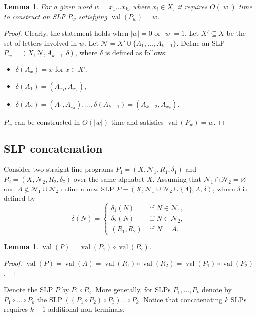 \documentclass[12pt,oneside]{amsart}
\newtheorem{lemma}[theorem]{Lemma}
\theoremstyle{definition}
\theoremstyle{case}
\def\CN{{\mathcal N}}
\DeclareMathOperator{\val}{val}
\begin{document}
\begin{lemma}\label{le:CP-w}
For a given word $w = x_1 \dots x_k$, where $x_i\in X$,
it requires $O(|w|)$ time to construct 
an SLP $P_w$ satisfying $\val(P_w) = w$.
\end{lemma}

\begin{proof}
Clearly, the statement holds when $|w|=0$ or $|w|=1$.
Let $X'\subseteq X$ be the set of letters involved in $w$.
Let $\CN=X' \cup \{A_1,\dots,A_{k-1}\}$.
Define an SLP $P_w=(X,\CN,A_{k-1},\delta)$, where $\delta$
is defined as follows:
\begin{itemize}
\item 
$\delta(A_x)=x$ for $x\in X'$,
\item 
$\delta(A_1) = (A_{x_1}, A_{x_2})$,
\item 
$\delta(A_2) = (A_1, A_{x_3}), \dots,\delta(A_{k-1}) = (A_{k-2}, A_{x_k})$.
\end{itemize}
$P_w$ can be constructed in $O(|w|)$ time and
satisfies $\val(P_w) = w$.
\end{proof}

\subsection{SLP concatenation}

Consider two straight-line programs 
$P_1 = (X, \CN_1, R_1, \delta_1)$ and
$P_2 = (X, \CN_2, R_2, \delta_2)$ over the same alphabet $X$.
Assuming that $\CN_1\cap\CN_2 = \varnothing$ and $A\notin \CN_1\cup\CN_2$
define a new SLP $P = (X, \CN_1\cup\CN_2 \cup \{A\}, A, \delta)$, where
$\delta$ is defined by
$$
\delta(N) = 
\begin{cases}
\delta_1(N) & \mbox{ if } N\in\CN_1,\\
\delta_2(N) & \mbox{ if } N\in\CN_2,\\
(R_1,R_2) & \mbox{ if } N=A.
\end{cases}
$$

\begin{lemma}
$\val(P) = \val(P_1) \circ \val(P_2)$.
\end{lemma}

\begin{proof}
$\val(P) = \val(A) = \val(R_1)\circ \val(R_2) = \val(P_1)\circ \val(P_2)$.
\end{proof}

Denote the SLP $P$ by $P_1\circ P_2$. More generally,
for SLPs $P_1,\dots,P_k$ denote by
$P_1\circ\dots\circ P_k$ the SLP
$((P_1\circ P_2) \circ P_3)\dots\circ P_k$.
Notice that concatenating $k$ SLPs requires $k-1$
additional non-terminals.
\end{document}
